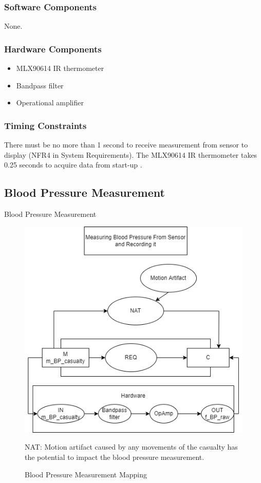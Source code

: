 \documentclass{article}
\newcounter{mnum}
\newcommand{\mthemnum}{M\themnum}
\begin{document}
\begin{description}
        \subsubsection{Software Components}
        None.
        \subsubsection{Hardware Components}
        \begin{itemize}
            \item MLX90614 IR thermometer
            \item Bandpass filter
            \item Operational amplifier
        \end{itemize}
        \subsubsection{Timing Constraints}
        There must be no more than 1 second to receive measurement from sensor to display (NFR4 in System Requirements).  The MLX90614 IR thermometer takes 0.25 seconds to acquire data from start-up \citep{melexis}.
    \newpage 
    
    \subsection{Blood Pressure Measurement} 
    \item [\refstepcounter{mnum} \mthemnum \label{BP_M}:] Blood Pressure Measurement
    \begin{figure}[!htb]
    	\centering
    	\includegraphics[width=0.5\linewidth]{mccharts-BloodPressureModule.drawio.png}
    	\caption{Blood Pressure Measurement Mapping}
    	{NAT: Motion artifact caused by any movements of the casualty has the potential to impact the blood pressure measurement.}
    \end{figure} 
        

\end{description}
\end{document}
